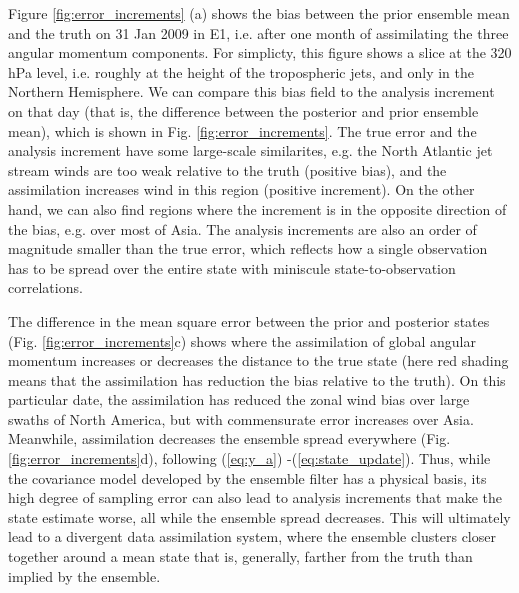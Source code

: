 Figure \ref{fig:error_increments} (a) shows the bias between the prior ensemble mean and the truth on 31 Jan 2009 in E1, i.e. after one month of assimilating the three angular momentum components. 
For simplicty, this figure shows a slice at the 320 hPa level, i.e. roughly at the height of the tropospheric jets, and only in the Northern Hemisphere. 
We can compare this bias field to the analysis increment on that day (that is, the difference between the posterior and prior ensemble mean), which is shown in Fig. \ref{fig:error_increments}.
The true error and the analysis increment have some large-scale similarites, e.g. the North Atlantic jet stream winds are too weak relative to the truth (positive bias), and the assimilation increases wind in this region (positive increment). 
On the other hand, we can also find regions where the increment is in the opposite direction of the bias, e.g. over most of Asia. 
The analysis increments are also an order of magnitude smaller than the true error, which reflects how a single observation has to be spread over the entire state with 
miniscule state-to-observation correlations.

The difference in the mean square error between the prior and posterior states (Fig. \ref{fig:error_increments}c) shows where the assimilation of global angular momentum increases or decreases the distance to the true state (here red shading means that the assimilation has reduction the bias relative to the truth).  
On this particular date, the assimilation has reduced the zonal wind bias over large swaths of North America, but with commensurate error increases over Asia. 
Meanwhile, assimilation decreases the ensemble spread everywhere (Fig. \ref{fig:error_increments}d), following (\ref{eq:y_a}) -(\ref{eq:state_update}).  
Thus, while the covariance model developed by the ensemble filter has a physical basis, its high degree of sampling error can also lead to analysis increments that make the state estimate worse, all while the ensemble spread decreases.  
This will ultimately lead to a divergent data assimilation system, where the ensemble clusters closer together around a mean state that is, generally, farther from the truth than implied by the ensemble. 


